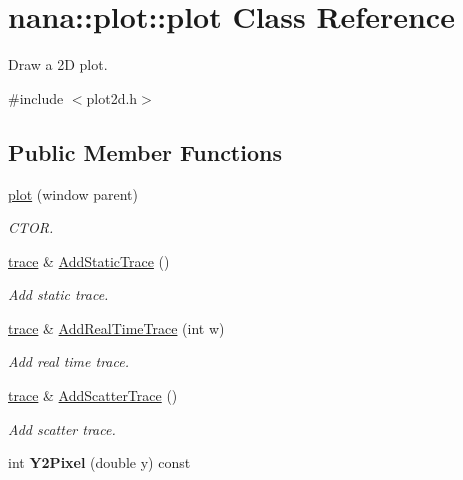 \hypertarget{classnana_1_1plot_1_1plot}{\section{nana\-:\-:plot\-:\-:plot Class Reference}
\label{classnana_1_1plot_1_1plot}
}


Draw a 2\-D plot.  




{\ttfamily \#include $<$plot2d.\-h$>$}

\subsection*{Public Member Functions}
\begin{DoxyCompactItemize}
\item 
\hyperlink{classnana_1_1plot_1_1plot_a36277db9ef5e9405e7a6b9621d10d539}{plot} (window parent)
\begin{DoxyCompactList}\small\item\em C\-T\-O\-R. \end{DoxyCompactList}\item 
\hyperlink{classnana_1_1plot_1_1trace}{trace} \& \hyperlink{classnana_1_1plot_1_1plot_ac537d6bd9cb05cd1702d71f9b721ddde}{Add\-Static\-Trace} ()
\begin{DoxyCompactList}\small\item\em Add static trace. \end{DoxyCompactList}\item 
\hyperlink{classnana_1_1plot_1_1trace}{trace} \& \hyperlink{classnana_1_1plot_1_1plot_a4cc1af8e943cecf919b2662c4d71c20c}{Add\-Real\-Time\-Trace} (int w)
\begin{DoxyCompactList}\small\item\em Add real time trace. \end{DoxyCompactList}\item 
\hyperlink{classnana_1_1plot_1_1trace}{trace} \& \hyperlink{classnana_1_1plot_1_1plot_a753b33d190cc2cbe2ba4176cec7b49d0}{Add\-Scatter\-Trace} ()
\begin{DoxyCompactList}\small\item\em Add scatter trace. \end{DoxyCompactList}\item 
\hypertarget{classnana_1_1plot_1_1plot_a4b0f06a34abd91b5600ce1bef2b378c5}{int {\bfseries Y2\-Pixel} (double y) const }\label{classnana_1_1plot_1_1plot_a4b0f06a34abd91b5600ce1bef2b378c5}


\end{DoxyCompactItemize}
